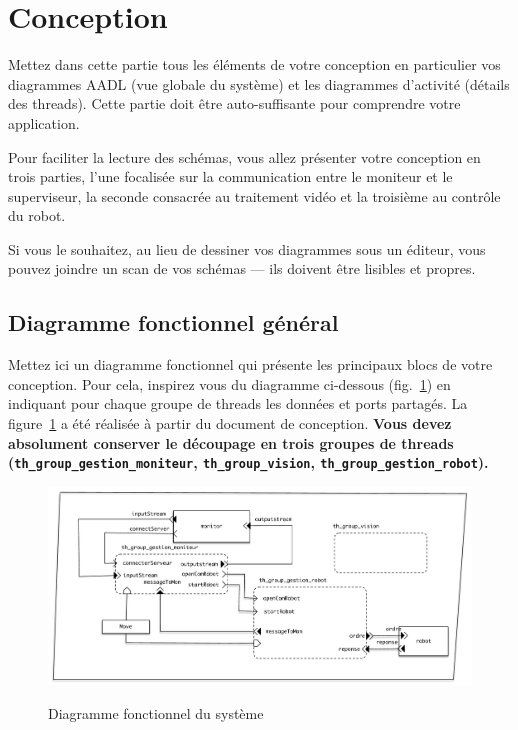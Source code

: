 \documentclass[11pt, a4paper]{paper}
\begin{document}
\newpage




\section{Conception}

{\color{red} Mettez dans cette partie tous les éléments de votre conception en particulier vos diagrammes AADL (vue globale du système) et les diagrammes d'activité (détails des threads). Cette partie doit être auto-suffisante pour comprendre votre application.

Pour faciliter la lecture des schémas, vous allez présenter votre conception en trois parties, l'une focalisée sur la communication entre le moniteur et le superviseur, la seconde consacrée au traitement vidéo et la troisième au contrôle du robot.

Si vous le souhaitez, au lieu de dessiner vos diagrammes sous un éditeur, vous pouvez joindre un scan de vos schémas — ils doivent être lisibles et propres.}

\subsection{Diagramme fonctionnel général}

{\color{red} Mettez ici un diagramme fonctionnel qui présente les principaux blocs de votre conception. Pour cela, inspirez vous du diagramme ci-dessous (fig.~\ref{fig:diag_fonc_gen}) en indiquant pour chaque groupe de threads les données et ports partagés. La figure~\ref{fig:diag_fonc_gen} a été réalisée à partir du document de conception. {\bf Vous devez absolument conserver le découpage en trois groupes de threads ({\tt th\_group\_gestion\_moniteur}, {\tt th\_group\_vision}, {\tt th\_group\_gestion\_robot}).}}

\begin{figure}[htbp]
\begin{center}
{\includegraphics[scale=.5]{./figures-pdf/diag_fonc_gen}}
{\caption{Diagramme fonctionnel du système}}
\end{center}
\label{fig:diag_fonc_gen}
\end{figure}
\FloatBarrier
\end{document}
